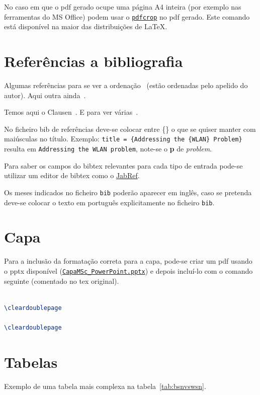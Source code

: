    No caso em que o pdf gerado ocupe uma página A4 inteira (por exemplo nas ferramentas do MS Office) podem usar o \texttt{\href{https://www.ctan.org/pkg/pdfcrop?lang=en}{pdfcrop}} no pdf gerado. Este comando está disponível na maior das distribuições de \LaTeX.


\section{Referências a bibliografia}
Algumas referências para se ver a ordenação~\cite{yaacoub2012} (estão ordenadas pelo apelido do autor). Aqui outra ainda~\cite{etsitr102732}.

Temos aqui o Clausen~\cite{Clausen2003}. E para ver várias~\cite{yaacoub2012, etsitr102732, strunk2007elements}.

No ficheiro bib de referências deve-se colocar entre \{\} o que se quiser manter com maiúsculas no título. Exemplo: \texttt{title = \{Addressing the \{WLAN\} Problem\}} resulta em \texttt{Addressing the WLAN problem}, note-se o \textbf{p} de \emph{problem}. 

Para saber os campos do bibtex relevantes para cada tipo de entrada pode-se utilizar um editor de bibtex como o \href{http://www.jabref.org}{JabRef}.

Os meses indicados no ficheiro \texttt{bib} poderão aparecer em inglês, caso se pretenda deve-se colocar o texto em português explicitamente no ficheiro \texttt{bib}.


\section{Capa}
Para a inclusão da formatação correta para a capa, pode-se criar um pdf usando o pptx disponível (\texttt{\href{}{CapaMSc\_PowerPoint.pptx}}) e depois incluí-lo com o comando seguinte (comentado no tex original).

\begin{lstlisting}[numbers=none,language=TeX,caption={[Capas tese] Incluir capas oficiais},label=lis:capasTese,float=htb]

\cleardoublepage

\cleardoublepage
\end{lstlisting}


\section{Tabelas}
Exemplo de uma tabela mais complexa na tabela~\ref{tab:bsnvswsn}.

